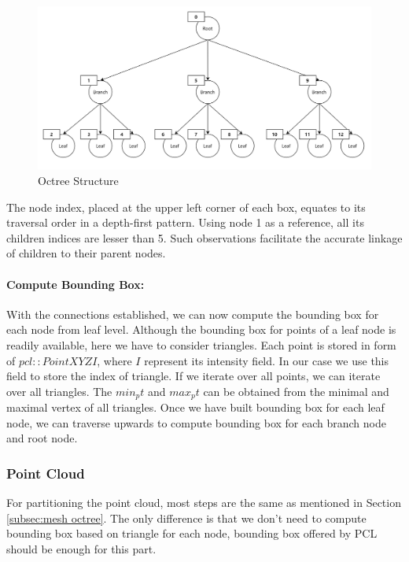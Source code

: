 \documentclass[11pt, a4paper,oneside,chapterprefix=false]{scrbook}
\begin{document}
\noindent
\begin{minipage}{\textwidth}
	\begin{figure}[H]
		\centering
		\includegraphics*[width=1.0\textwidth]{figures/octree.png}
		\caption{Octree Structure}
		\label{fig:octree structure}
	\end{figure}
\end{minipage}

The node index, placed at the upper left corner of each box, equates to its traversal order in a depth-first pattern. Using node 1 as a reference, all its children indices are lesser than 5. Such observations facilitate the accurate linkage of children to their parent nodes.

\paragraph{Compute Bounding Box:}  With the connections established, we can now compute the bounding box for each node from leaf level. Although the bounding box for points of a leaf node is readily available, here we have to consider triangles. Each point is stored in form of $pcl::PointXYZI$, where $I$ represent its intensity field. In our case we use this field to store the index of triangle. If we iterate over all points, we can iterate over all triangles. The $min_pt$ and $max_pt$ can be obtained from the minimal and maximal vertex of all triangles. Once we have built bounding box for each leaf node, we can traverse upwards to compute bounding box for each branch node and root node. 

\subsubsection{Point Cloud}

For partitioning the point cloud, most steps are the same as mentioned in Section \ref{subsec:mesh octree}. The only difference is that we don't need to compute bounding box based on triangle for each node, bounding box offered by PCL should be enough for this part.
\end{document}

